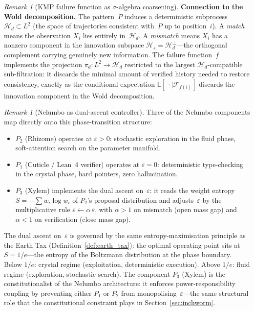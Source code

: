 \documentclass[11pt,a4paper]{article}
\theoremstyle{definition}
\theoremstyle{remark}
\newtheorem{remark}[theorem]{Remark}
\begin{document}
\begin{remark}[KMP failure function as $\sigma$-algebra coarsening]
\medskip\noindent\textbf{Connection to the Wold decomposition.}
The pattern~$P$ induces a deterministic subprocess
$\mathcal{H}_d \subset L^2$ (the space of trajectories consistent
with~$P$ up to position~$i$).
A \emph{match} means the observation $X_i$ lies entirely
in~$\mathcal{H}_d$.
A \emph{mismatch} means $X_i$ has a nonzero component in the
innovation subspace $\mathcal{H}_s = \mathcal{H}_d^\perp$---the
orthogonal complement carrying genuinely new information.
The failure function~$f$ implements the projection
$\pi_d \colon L^2 \to \mathcal{H}_d$ restricted to the largest
$\mathcal{H}_d$-compatible sub-filtration:
it discards the minimal amount of verified history needed to restore
consistency, exactly as the conditional expectation
$\mathbb{E}[\,\cdot\mid\mathcal{F}_{f(i)}]$
discards the innovation component in the Wold decomposition.
\end{remark}

\begin{remark}[Nelumbo as dual-ascent controller]
Three of the Nelumbo components map directly onto this
phase-transition structure:
\begin{itemize}[nosep]
\item $P_2$ (Rhizome) operates at $\varepsilon > 0$: stochastic
  exploration in the fluid phase, soft-attention search on the
  parameter manifold.
\item $P_1$ (Cuticle / Lean~4 verifier) operates at $\varepsilon = 0$:
  deterministic type-checking in the crystal phase, hard pointers,
  zero hallucination.
\item $P_3$ (Xylem) implements the dual ascent on~$\varepsilon$:
  it reads the weight entropy $S = -\sum w_i \log w_i$ of $P_2$'s
  proposal distribution and adjusts~$\varepsilon$ by the multiplicative
  rule $\varepsilon \leftarrow \alpha\,\varepsilon$, with
  $\alpha > 1$ on mismatch (open mass gap) and $\alpha < 1$ on
  verification (close mass gap).
\end{itemize}

\noindent
The dual ascent on~$\varepsilon$ is governed by the same
entropy-maximisation principle as the Earth Tax
(Definition~\ref{def:earth_tax}):
the optimal operating point sits at $S = 1/e$---the entropy of the
Boltzmann distribution at the phase boundary.
Below $1/e$: crystal regime (exploitation, deterministic execution).
Above $1/e$: fluid regime (exploration, stochastic search).
The component $P_3$ (Xylem) is the constitutionalist of the Nelumbo
architecture: it enforces power-responsibility coupling by preventing
either $P_1$ or $P_2$ from monopolising~$\varepsilon$---the same
structural role that the constitutional constraint plays in
Section~\ref{sec:inchworm}.
\end{remark}
\end{document}
